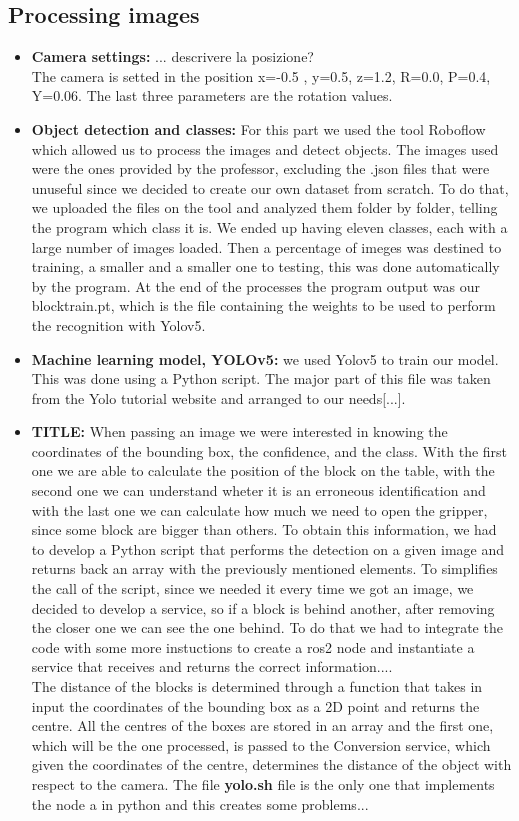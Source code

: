 \documentclass[12pt,a4paper]{article}
\begin{document}
\subsection{Processing images}\label{subsec:imageproc}
\begin{itemize}
    \item \textbf{Camera settings:} ... descrivere la posizione?\\
    The camera is setted in the position x=-0.5 , y=0.5, z=1.2, R=0.0, P=0.4, Y=0.06. The last three parameters are the rotation values.
    \item \textbf{Object detection and classes:} For this part we used the tool Roboflow which allowed us to process the images and detect objects. The images used were the ones provided by the professor, excluding the .json files that were unuseful since we decided to create our own dataset from scratch. To do that, we uploaded the files on the tool and analyzed them folder by folder, telling the program which class it is. We ended up having eleven classes, each with a large number of images loaded. Then a percentage of imeges was destined to training, a smaller and a smaller one to testing, this was done automatically by the program. At the end of the processes the program output was our blocktrain.pt, which is the file containing the weights to be used to perform the recognition with Yolov5.
    \item \textbf{Machine learning model, YOLOv5:} we used Yolov5 to train our model. This was done using a Python script. The major part of this file was taken from the Yolo tutorial website and arranged to our needs[...]. 
    \item \textbf{TITLE:} When passing an image we were interested in knowing the coordinates of the bounding box, the confidence, and the class. With the first one we are able to calculate the position of the block on the table, with the second one we can understand wheter it is an erroneous identification and with the last one we can calculate how much we need to open the gripper, since some block are bigger than others. To obtain this information, we had to develop a Python script that performs the detection on a given image and returns back an array with the previously mentioned elements. To simplifies the call of the script, since we needed it every time we got an image, we decided to develop a service, so if a block is behind another, after removing the closer one we can see the one behind. To do that we had to integrate the code with some more instuctions to create a ros2 node and instantiate a service that receives and returns the correct information....\\
    The distance of the blocks is determined through a function that takes in input the coordinates of the bounding box as a 2D point and returns the centre. All the centres of the boxes are stored in an array and the first one, which will be the one processed, is passed to the Conversion service, which given the coordinates of the centre, determines the distance of the object with respect to the camera.
    The file \textbf{yolo.sh} file is the only one that implements the node a in python and this creates some problems...
\end{itemize}
\end{document}
